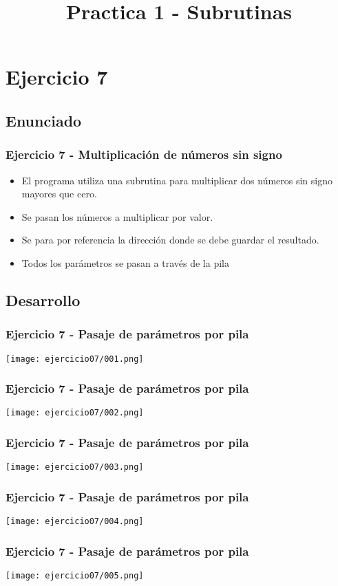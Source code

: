 \documentclass{beamer}
\title{Practica 1 - Subrutinas}
\begin{document}
\begin{frame}
\titlepage
\end{frame}

\section{Ejercicio 7}

\subsection{Enunciado}
\begin{frame}
\frametitle{Ejercicio 7 - Multiplicación de números sin signo}
\begin{itemize}
\item El programa utiliza una subrutina para multiplicar dos números sin signo mayores que cero.
\item Se pasan los números a multiplicar por valor.  
\item Se para por referencia la dirección donde se debe guardar el resultado.
\item Todos los parámetros se pasan a través de la pila
\end{itemize}
\end{frame}

\subsection{Desarrollo}
\begin{frame}
\frametitle{Ejercicio 7 - Pasaje de parámetros por pila}
\texttt{[image: ejercicio07/001.png]}
\end{frame}

\begin{frame}
\frametitle{Ejercicio 7 - Pasaje de parámetros por pila}
\texttt{[image: ejercicio07/002.png]}
\end{frame}

\begin{frame}
\frametitle{Ejercicio 7 - Pasaje de parámetros por pila}
\texttt{[image: ejercicio07/003.png]}
\end{frame}

\begin{frame}
\frametitle{Ejercicio 7 - Pasaje de parámetros por pila}
\texttt{[image: ejercicio07/004.png]}
\end{frame}

\begin{frame}
\frametitle{Ejercicio 7 - Pasaje de parámetros por pila}
\texttt{[image: ejercicio07/005.png]}
\end{frame}
\end{document}
